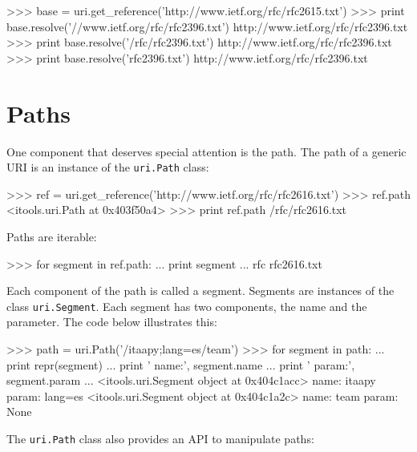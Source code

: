 \begin{code}
    >>> base = uri.get_reference('http://www.ietf.org/rfc/rfc2615.txt')
    >>> print base.resolve('//www.ietf.org/rfc/rfc2396.txt')
    http://www.ietf.org/rfc/rfc2396.txt
    >>> print base.resolve('/rfc/rfc2396.txt')
    http://www.ietf.org/rfc/rfc2396.txt
    >>> print base.resolve('rfc2396.txt')
    http://www.ietf.org/rfc/rfc2396.txt
\end{code}


\section{Paths}

One component that deserves special attention is the path. The path of a
generic URI is an instance of the {\tt uri.Path} class:

\begin{code}
    >>> ref = uri.get_reference('http://www.ietf.org/rfc/rfc2616.txt')
    >>> ref.path
    <itools.uri.Path at 0x403f50a4>
    >>> print ref.path
    /rfc/rfc2616.txt
\end{code}

Paths are iterable:

\begin{code}
    >>> for segment in ref.path:
    ...     print segment
    ... 
    rfc
    rfc2616.txt
\end{code}

Each component of the path is called a segment. Segments are instances of
the class {\tt uri.Segment}. Each segment has two components, the name and
the parameter. The code below illustrates this:

\begin{code}
    >>> path = uri.Path('/itaapy;lang=es/team')
    >>> for segment in path:
    ...     print repr(segment)
    ...     print '  name:', segment.name
    ...     print '  param:', segment.param
    ... 
    <itools.uri.Segment object at 0x404c1acc>
      name: itaapy
      param: lang=es
    <itools.uri.Segment object at 0x404c1a2c>
      name: team
      param: None
\end{code}

The {\tt uri.Path} class also provides an API to manipulate paths:

